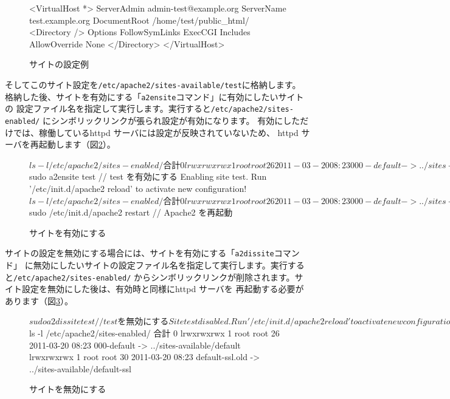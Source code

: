 \documentclass[mingoth,a4paper]{jsarticle}
\begin{document}
\begin{figure}[ht]
\begin{commandline}
<VirtualHost *>
    ServerAdmin admin-test@example.org
    ServerName test.example.org
    DocumentRoot /home/test/public_html/
    <Directory />
        Options FollowSymLinks ExecCGI Includes
        AllowOverride None
    </Directory>
</VirtualHost>
\end{commandline}
\label{fig:siteexample}\caption{サイトの設定例}
\end{figure}

そしてこのサイト設定を\texttt{/etc/apache2/sites-available/test}に格納します。
格納した後、サイトを有効にする「\texttt{a2ensite}コマンド」に有効にしたいサイトの
設定ファイル名を指定して実行します。実行すると\texttt{/etc/apache2/sites-enabled/}
にシンボリックリンクが張られ設定が有効になります。
有効にしただけでは、稼働しているhttpd サーバには設定が反映されていないため、
httpd サーバを再起動します（図\ref{fig:siteenable-setting}）。

\begin{figure}[ht]
\begin{commandline}
$ ls -l /etc/apache2/sites-enabled/
合計 0
lrwxrwxrwx 1 root root 26 2011-03-20 08:23 000-default -> ../sites-available/default
lrwxrwxrwx 1 root root 30 2011-03-20 08:23 default-ssl.old -> ../sites-available/default-ssl
$ sudo a2ensite test // test を有効にする
Enabling site test.
Run '/etc/init.d/apache2 reload' to activate new configuration!
$ ls -l /etc/apache2/sites-enabled/
合計 0
lrwxrwxrwx 1 root root 26 2011-03-20 08:23 000-default -> ../sites-available/default
lrwxrwxrwx 1 root root 29 2012-03-10 06:24 test -> ../sites-available/test
lrwxrwxrwx 1 root root 30 2011-03-20 08:23 default-ssl.old -> ../sites-available/default-ssl
$ sudo /etc/init.d/apache2 restart // Apache2 を再起動
\end{commandline}
\label{fig:siteenable-setting}\caption{サイトを有効にする}
\end{figure}

サイトの設定を無効にする場合には、サイトを有効にする「\texttt{a2dissite}コマンド」
に無効にしたいサイトの設定ファイル名を指定して実行します。実行すると\texttt{/etc/apache2/sites-enabled/}
からシンボリックリンクが削除されます。サイト設定を無効にした後は、有効時と同様にhttpd サーバを
再起動する必要があります（図\ref{fig:sitedisable-setting}）。

\begin{figure}[ht]
\begin{commandline}
$ sudo a2dissite test // test を無効にする
Site test disabled.
Run '/etc/init.d/apache2 reload' to activate new configuration!
$ ls -l /etc/apache2/sites-enabled/
合計 0
lrwxrwxrwx 1 root root 26 2011-03-20 08:23 000-default -> ../sites-available/default
lrwxrwxrwx 1 root root 30 2011-03-20 08:23 default-ssl.old -> ../sites-available/default-ssl
\end{commandline}

\label{fig:sitedisable-setting}\caption{サイトを無効にする}
\end{figure}
\end{document}
